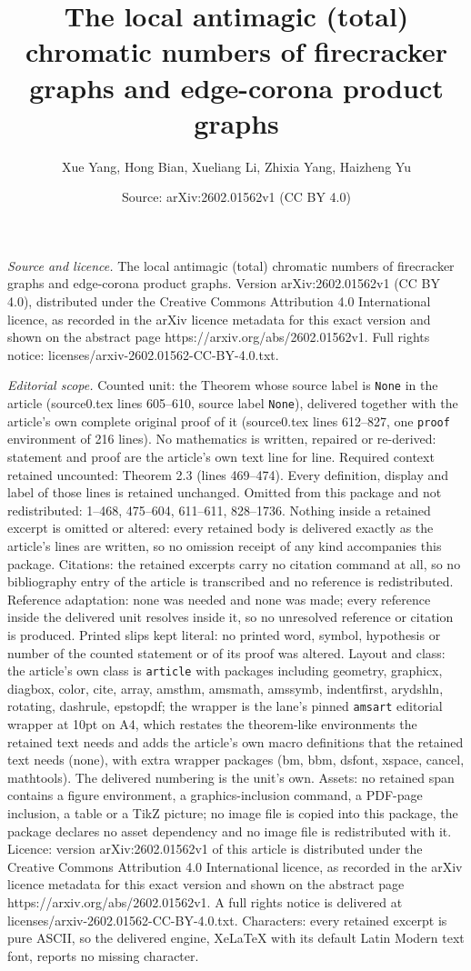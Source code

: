 \documentclass[10pt,a4paper]{amsart}
\title[The local antimagic (total) chromatic numbers of firecracker]{The local antimagic (total) chromatic numbers of firecracker graphs and edge-corona product graphs}
\author{Xue Yang, Hong Bian, Xueliang Li, Zhixia Yang, Haizheng Yu}
\date{Source: arXiv:2602.01562v1 (CC BY 4.0)}
\begin{document}
\maketitle

\noindent\emph{Source and licence.} The local antimagic (total) chromatic numbers of firecracker graphs and edge-corona product graphs. Version arXiv:2602.01562v1 (CC BY 4.0), distributed under the Creative Commons Attribution 4.0 International licence, as recorded in the arXiv licence metadata for this exact version and shown on the abstract page https://arxiv.org/abs/2602.01562v1. Full rights notice: licenses/arxiv-2602.01562-CC-BY-4.0.txt.\par\smallskip

\noindent\textit{Editorial scope.} Counted unit: the Theorem whose source label is \texttt{None} in the article (source0.tex lines 605--610, source label \texttt{None}), delivered together with the article's own complete original proof of it (source0.tex lines 612--827, one \texttt{proof} environment of 216 lines). No mathematics is written, repaired or re-derived: statement and proof are the article's own text line for line. Required context retained uncounted: Theorem 2.3 (lines 469--474). Every definition, display and label of those lines is retained unchanged. Omitted from this package and not redistributed: 1--468, 475--604, 611--611, 828--1736. Nothing inside a retained excerpt is omitted or altered: every retained body is delivered exactly as the article's lines are written, so no omission receipt of any kind accompanies this package. Citations: the retained excerpts carry no citation command at all, so no bibliography entry of the article is transcribed and no reference is redistributed. Reference adaptation: none was needed and none was made; every reference inside the delivered unit resolves inside it, so no unresolved reference or citation is produced. Printed slips kept literal: no printed word, symbol, hypothesis or number of the counted statement or of its proof was altered. Layout and class: the article's own class is \texttt{article} with packages including geometry, graphicx, diagbox, color, cite, array, amsthm, amsmath, amssymb, indentfirst, arydshln, rotating, dashrule, epstopdf; the wrapper is the lane's pinned \texttt{amsart} editorial wrapper at 10pt on A4, which restates the theorem-like environments the retained text needs and adds the article's own macro definitions that the retained text needs (none), with extra wrapper packages (bm, bbm, dsfont, xspace, cancel, mathtools). The delivered numbering is the unit's own. Assets: no retained span contains a figure environment, a graphics-inclusion command, a PDF-page inclusion, a table or a TikZ picture; no image file is copied into this package, the package declares no asset dependency and no image file is redistributed with it. Licence: version arXiv:2602.01562v1 of this article is distributed under the Creative Commons Attribution 4.0 International licence, as recorded in the arXiv licence metadata for this exact version and shown on the abstract page https://arxiv.org/abs/2602.01562v1. A full rights notice is delivered at licenses/arxiv-2602.01562-CC-BY-4.0.txt. Characters: every retained excerpt is pure ASCII, so the delivered engine, XeLaTeX with its default Latin Modern text font, reports no missing character.
\end{document}
